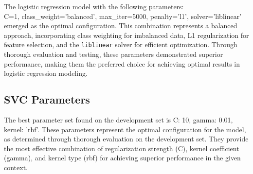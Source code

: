 \documentclass[conference]{IEEEtran}
\begin{document}
The logistic regression model with the following parameters: \\
{ C=1, class\_weight='balanced', max\_iter=5000, penalty='l1', solver='liblinear'} 
emerged as the optimal configuration. This combination represents a balanced approach, incorporating class weighting for imbalanced data, L1 regularization for feature selection, and the \texttt{liblinear} solver for efficient optimization. Through thorough evaluation and testing, these parameters demonstrated superior performance, making them the preferred choice for achieving optimal results in logistic regression modeling.

\subsection{SVC Parameters}

\begin{table}[htbp]
\centering
{}
\caption{Possible Values for SVC Parameters}
\label{tab:logistic-reg-params}
\end{table}

\begin{table}[htbp]
\centering
{}
\caption{SVC Report}
\label{tab:svm-comparison}
\end{table}

The best parameter set found on the development set is {C: 10, gamma: 0.01, kernel: 'rbf'}. These parameters represent the optimal configuration for the model, as determined through thorough evaluation on the development set. They provide the most effective combination of regularization strength (C), kernel coefficient (gamma), and kernel type (rbf) for achieving superior performance in the given context.
\end{document}
